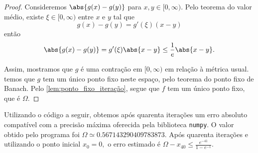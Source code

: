 \begin{proof}
    Consideremos \(\abs{g(x) - g(y)}\) para \(x,y \in [0,\infty)\). Pelo teorema do valor médio, existe \(\xi \in [0, \infty)\) entre \(x\) e \(y\) tal que
    \begin{equation*}
        g(x) - g(y) = g'(\xi) (x-y)
    \end{equation*}
    então
    \begin{equation*}
        \abs{g(x) - g(y)} = g'(\xi)\abs{x - y} \leq \frac1e \abs{x - y}.
    \end{equation*}

    Assim, mostramos que \(g\) é uma contração em \([0, \infty)\) em relação à métrica usual. \todo[Como \([0, \infty)\) dotado da métrica usual é um espaço métrico completo,] temos que \(g\) tem um único ponto fixo neste espaço, pelo teorema do ponto fixo de Banach. Pelo \cref{lem:ponto_fixo_iteração}, segue que \(f\) tem um único ponto fixo, que é \(\Omega\).
\end{proof}

Utilizando o código a seguir, obtemos após quarenta iterações um erro absoluto compatível com a precisão máxima oferecida pela biblioteca \verb|numpy|. O valor obtido pelo programa foi \(\Omega \simeq0.567143290409783873\). Após quarenta iterações e utilizando o ponto inicial \(x_0 = 0,\) o erro estimado é \(\Omega - x_{40} \leq \frac{e^{-41}}{1 - e^{-1}}.\)
\begin{listing}[h]
    \inputminted[linenos]{Python}{exercício10.py}
\end{listing}
